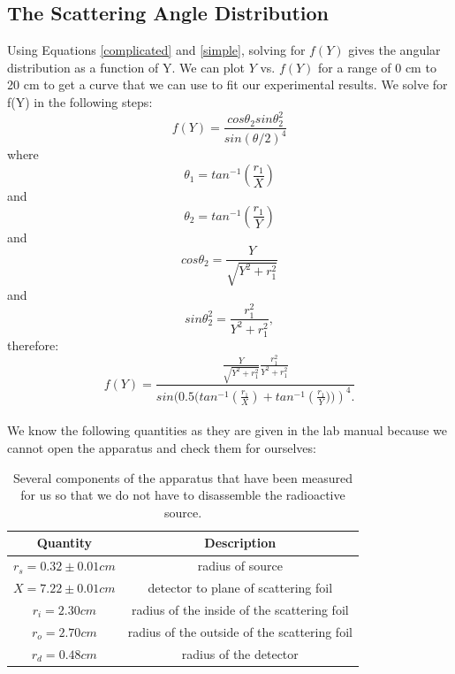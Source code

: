 \subsection{The Scattering Angle Distribution}
Using Equations \ref{complicated} and \ref{simple}, solving for $f(Y)$ gives the angular distribution as a function of Y. We can plot $Y$ vs. $f(Y)$ for a range of 0 cm to 20 cm to get a curve that we can use to fit our experimental results. We solve for f(Y) in the following steps:
\begin{equation} f(Y)=\frac{cos\theta_2 sin\theta_2^2}{sin(\theta/2)^4} \end{equation} where
\begin{equation} \theta_1=tan^{-1}\left(\frac{r_1}{X}\right)\end{equation} and
\begin{equation} \theta_2=tan^{-1}\left(\frac{r_1}{Y}\right)\end{equation} and
\begin{equation} cos\theta_2=\frac{Y}{\sqrt{Y^2+r_1^2}} \end{equation} and
\begin{equation} sin\theta_2^2=\frac{r_1^2}{Y^2+r_1^2}, \end{equation} therefore:
\begin{equation} f(Y)= \frac{\frac{Y}{\sqrt{Y^2+r_1^2}} \frac{r_1^2}{Y^2+r_1^2}}{sin(0.5(tan^{-1}\left(\frac{r_1}{X}\right) + tan^{-1}\left(\frac{r_1}{Y}))\right)^4.} \end{equation}\\
We know the following quantities as they are given in the lab manual because we cannot open the apparatus and check them for ourselves:
\begin{table}[H]
\begin{center}
\begin{tabular}{|c|c|}\hline
Quantity & Description \\ \hline 
$r_s=0.32\pm0.01cm$ & radius of source\\ \hline 
$X=7.22\pm0.01cm$ & detector to plane of scattering foil\\ \hline
$r_i=2.30cm$ & radius of the inside of the scattering foil\\ \hline
$r_o=2.70cm$ & radius of the outside of the scattering foil\\ \hline
$r_d=0.48cm$ & radius of the detector\\ \hline
\end{tabular}
\caption{Several components of the apparatus that have been measured for us so that we do not have to disassemble the radioactive source.}
\end{center}
\end{table}

